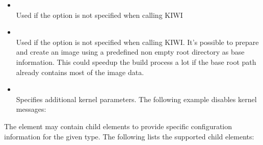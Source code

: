 \begin{itemize}
\item {}\\
      Used if the option  is not specified when calling KIWI
\item {}\\
      Used if the option  is not specified when
      calling KIWI. It's possible to prepare and create an image using a
      predefined non empty root directory as base information.
      This could speedup the build process a lot if the base root path
      already contains most of the image data.
\item {}\\
      Specifies additional kernel parameters. The following example
      disables kernel messages: 
\end{itemize}

The  element may contain child elements to provide specific
configuration information for the given type. The following lists the 
supported child elements:

